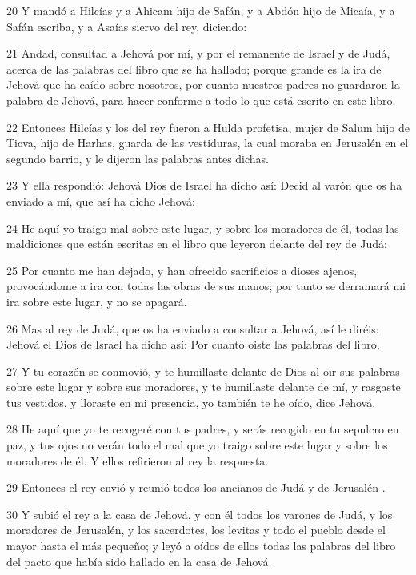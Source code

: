 \par 20 Y mandó a Hilcías y a Ahicam hijo de Safán, y a Abdón hijo de Micaía, y a Safán escriba, y a Asaías siervo del rey, diciendo:
\par 21 Andad, consultad a Jehová por mí, y por el remanente de Israel y de Judá, acerca de las palabras del libro que se ha hallado; porque grande es la ira de Jehová que ha caído sobre nosotros, por cuanto nuestros padres no guardaron la palabra de Jehová, para hacer conforme a todo lo que está escrito en este libro.
\par 22 Entonces Hilcías y los del rey fueron a Hulda profetisa, mujer de Salum hijo de Ticva, hijo de Harhas, guarda de las vestiduras, la cual moraba en Jerusalén  en el segundo barrio, y le dijeron las palabras antes dichas.
\par 23 Y ella respondió: Jehová Dios de Israel ha dicho así: Decid al varón que os ha enviado a mí, que así ha dicho Jehová:
\par 24 He aquí yo traigo mal sobre este lugar, y sobre los moradores de él, todas las maldiciones que están escritas en el libro que leyeron delante del rey de Judá:
\par 25 Por cuanto me han dejado, y han ofrecido sacrificios a dioses ajenos, provocándome a ira con todas las obras de sus manos; por tanto se derramará mi ira sobre este lugar, y no se apagará.
\par 26 Mas al rey de Judá, que os ha enviado a consultar a Jehová, así le diréis: Jehová el Dios de Israel ha dicho así: Por cuanto oiste las palabras del libro,
\par 27 Y tu corazón se conmovió, y te humillaste delante de Dios al oir sus palabras sobre este lugar y sobre sus moradores, y te humillaste delante de mí, y rasgaste tus vestidos, y lloraste en mi presencia, yo también te he oído, dice Jehová.
\par 28 He aquí que yo te recogeré con tus padres, y serás recogido en tu sepulcro en paz, y tus ojos no verán todo el mal que yo traigo sobre este lugar y sobre los moradores de él. Y ellos refirieron al rey la respuesta.
\par 29 Entonces el rey envió y reunió todos los ancianos de Judá y de Jerusalén .
\par 30 Y subió el rey a la casa de Jehová, y con él todos los varones de Judá, y los moradores de Jerusalén, y los sacerdotes, los levitas y todo el pueblo desde el mayor hasta el más pequeño; y leyó a oídos de ellos todas las palabras del libro del pacto que había sido hallado en la casa de Jehová.
